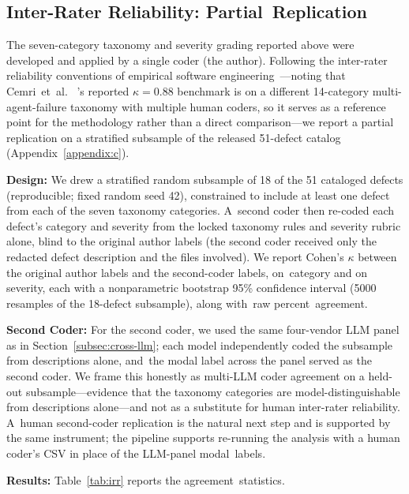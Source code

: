 \documentclass[software,article,accept,pdftex,oneauthor]{Definitions/mdpi}
\begin{document}
\subsection{Inter-Rater Reliability: Partial~Replication}
\label{subsec:irr}

The seven-category taxonomy and severity grading reported above were developed and applied by a single coder (the author). Following the inter-rater reliability conventions of empirical software engineering~\cite{cemri2025multiagent_fail}---noting that Cemri~et~al.~\cite{cemri2025multiagent_fail}%
's reported $\kappa = 0.88$ benchmark is on a different 14-category multi-agent-failure taxonomy with multiple human coders, so it serves as a reference point for the methodology rather than a direct comparison---we report a partial replication on a stratified subsample of the released 51-defect catalog (Appendix~\ref{appendix:c}).

\textbf{Design:} We drew a stratified random subsample of 18 of the 51 cataloged defects (reproducible; fixed random seed 42), constrained to include at least one defect from each of the seven taxonomy categories. A~second coder then re-coded each defect's category and severity from the locked taxonomy rules and severity rubric alone, blind to the original author labels (the second coder received only the redacted defect description and the files involved). We report Cohen's $\kappa$ between the original author labels and the second-coder labels, on~category and on severity, each with a nonparametric bootstrap 95\% confidence interval (5000 resamples of the 18-defect subsample), along with~raw percent~agreement.

\textbf{Second Coder:} For the second coder, we used the same four-vendor LLM panel as in Section~\ref{subsec:cross-llm}; each model independently coded the subsample from descriptions alone, and~the modal label across the panel served as the second coder. We frame this honestly as multi-LLM coder agreement on a held-out subsample---evidence that the taxonomy categories are model-distinguishable from descriptions alone---and not as a substitute for human inter-rater reliability. A~human second-coder replication is the natural next step and is supported by the same instrument; the pipeline supports re-running the analysis with a human coder's CSV in place of the LLM-panel modal~labels.

\textbf{Results:} Table~\ref{tab:irr} reports the agreement~statistics.
\end{document}

